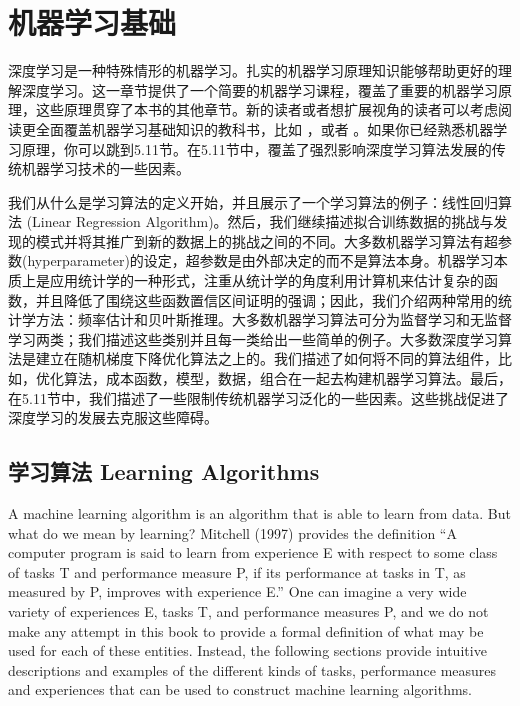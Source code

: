 \chapter{机器学习基础}
\label{ch:ml}

深度学习是一种特殊情形的机器学习。扎实的机器学习原理知识能够帮助更好的理解深度学习。这一章节提供了一个简要的机器学习课程，覆盖了重要的机器学习原理，这些原理贯穿了本书的其他章节。新的读者或者想扩展视角的读者可以考虑阅读更全面覆盖机器学习基础知识的教科书，比如 \cite{MMmphy}，或者 \cite{Bishop}。如果你已经熟悉机器学习原理，你可以跳到5.11节。在5.11节中，覆盖了强烈影响深度学习算法发展的传统机器学习技术的一些因素。

我们从什么是学习算法的定义开始，并且展示了一个学习算法的例子：线性回归算法 (Linear Regression Algorithm)。然后，我们继续描述拟合训练数据的挑战与发现的模式并将其推广到新的数据上的挑战之间的不同。大多数机器学习算法有超参数(hyperparameter)的设定，超参数是由外部决定的而不是算法本身。机器学习本质上是应用统计学的一种形式，注重从统计学的角度利用计算机来估计复杂的函数，并且降低了围绕这些函数置信区间证明的强调；因此，我们介绍两种常用的统计学方法：频率估计和贝叶斯推理。大多数机器学习算法可分为监督学习和无监督学习两类；我们描述这些类别并且每一类给出一些简单的例子。大多数深度学习算法是建立在随机梯度下降优化算法之上的。我们描述了如何将不同的算法组件，比如，优化算法，成本函数，模型，数据，组合在一起去构建机器学习算法。最后，在5.11节中，我们描述了一些限制传统机器学习泛化的一些因素。这些挑战促进了深度学习的发展去克服这些障碍。

\section{学习算法 Learning Algorithms}

A machine learning algorithm is an algorithm that is able to learn from data. But what do we mean by learning? Mitchell (1997) provides the definition “A computer program is said to learn from experience E with respect to some class of tasks T and performance measure P, if its performance at tasks in T, as measured by P, improves with experience E.” One can imagine a very wide variety of experiences E, tasks T, and performance measures P, and we do not make any attempt in this book to provide a formal definition of what may be used for each of these entities. Instead, the following sections provide intuitive descriptions and examples of the different kinds of tasks, performance measures and experiences that can be used to construct machine learning algorithms.

